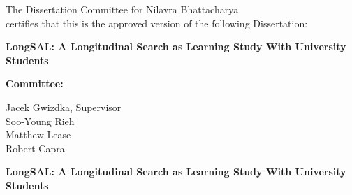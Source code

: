 \documentclass[letterpaper, nobind]{templates/ociamthesis}
\begin{document}
\begin{romanpages}



\thispagestyle{empty} %
\begin{center}
  The Dissertation Committee for Nilavra Bhattacharya\\
  certifies that this is the approved version of the following Dissertation:\\
  \vspace*{30pt}
  \begin{spacing}{2}
    {\Large{\textbf{LongSAL: A Longitudinal Search as Learning Study With University Students}}}
  \end{spacing}
\end{center}

\vspace*{55pt}

\phantom{x}\hspace{45ex} {\large{\textbf{Committee:}}}\\

\begin{flushright}
  Jacek Gwizdka, Supervisor\\
  \vspace*{24pt}
  Soo-Young Rieh\\
  \vspace*{24pt}
  Matthew Lease\\
  \vspace*{24pt}
  Robert Capra
\end{flushright}


\newpage
\thispagestyle{empty} %
\begin{center}
  
  \begin{spacing}{2}
    {\Large{\textbf{LongSAL: A Longitudinal Search as Learning Study With University Students}}}
  \end{spacing}
  

\end{center}
\end{romanpages}
\end{document}
